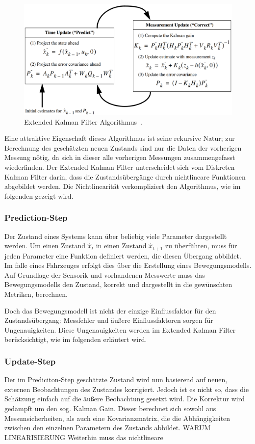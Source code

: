 \documentclass[11pt]{article}
\begin{document}
\begin{figure}[!t]
	\centering
	\includegraphics[width=5in]{EKF_algorithm.png}
	\caption{Extended Kalman Filter Algorithmus~\cite{EKF_course}.}
	\label{EKF-Algorithmus}
\end{figure}

Eine attraktive Eigenschaft dieses Algorithmus ist seine rekursive Natur; zur Berechnung des geschätzten neuen Zustands sind nur die Daten der vorherigen Messung nötig, da sich  in dieser alle vorherigen Messungen zusammengefasst wiederfinden. Der Extended Kalman Filter unterscheidet sich vom Diskreten Kalman Filter darin, dass die Zustandsübergänge durch nichtlineare Funktionen abgebildet werden. Die Nichtlinearität verkompliziert den Algorithmus, wie im folgenden gezeigt wird.

\subsubsection{Prediction-Step}
Der Zustand eines Systems kann über beliebig viele Parameter dargestellt werden. Um einen Zustand $\hat{x}_t$ in einen Zustand $\hat{x}_{t+1}$ zu überführen, muss für jeden Parameter eine Funktion definiert werden, die diesen Übergang abbildet. Im falle eines Fahrzeuges erfolgt dies über die Erstellung eines Bewegungsmodells. Auf Grundlage der Sensorik und vorhandenen Messwerte muss das Bewegungsmodells den Zustand, korrekt und dargestellt in die gewünschten Metriken, berechnen.

Doch das Bewegungsmodell ist nicht der einzige Einflussfaktor für den Zustandsübergang: Messfehler und äußere Einflussfaktoren sorgen für Ungenauigkeiten. Diese Ungenauigkeiten werden im Extended Kalman Filter berücksichtigt, wie im folgenden erläutert wird.

\subsubsection{Update-Step}
Der im Prediciton-Step geschätzte Zustand wird nun basierend auf neuen, externen Beobachtungen des Zustandes korrigiert. Jedoch ist es nicht so, dass die Schätzung einfach auf die äußere Beobachtung gesetzt wird. Die Korrektur wird gedämpft um den sog. Kalman Gain. Dieser berechnet sich sowohl aus Messunsicherheiten, als auch eine Kovarianzmatrix, die die Abhängigkeiten zwischen den einzelnen Parametern des Zustands abbildet. WARUM LINEARISIERUNG Weiterhin muss das nichtlineare 
\end{document}

